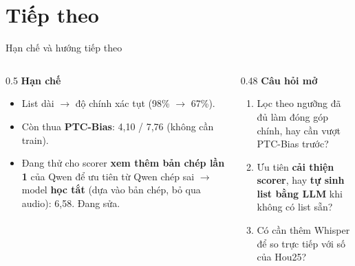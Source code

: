\documentclass[aspectratio=169,xcolor=table]{beamer}
\newcommand{\bad}[1]{\textcolor{RiskRed}{\textbf{#1}}}
\begin{document}
\section{Tiếp theo}
\begin{frame}{Hạn chế và hướng tiếp theo}
\begin{columns}[T]
\begin{column}{0.5\textwidth}
\textbf{Hạn chế}
\begin{itemize}\itemsep4pt
\item List dài $\rightarrow$ độ chính xác tụt (98\% $\rightarrow$ 67\%).
\item Còn thua \textbf{PTC-Bias}: 4,10 / 7,76 (không cần train).
\item Đang thử cho scorer \textbf{xem thêm bản chép lần 1} của Qwen để ưu tiên từ Qwen chép sai $\rightarrow$ model \bad{học tắt} (dựa vào bản chép, bỏ qua audio): 6,58. Đang sửa.
\end{itemize}
\end{column}
\begin{column}{0.48\textwidth}
\textbf{Câu hỏi mở}
\begin{enumerate}\itemsep4pt
\item Lọc theo ngưỡng đã đủ làm đóng góp chính, hay cần vượt PTC-Bias trước?
\item Ưu tiên \textbf{cải thiện scorer}, hay \textbf{tự sinh list bằng LLM} khi không có list sẵn?
\item Có cần thêm Whisper để so trực tiếp với số của Hou25?
\end{enumerate}
\end{column}
\end{columns}
\end{frame}
\end{document}
